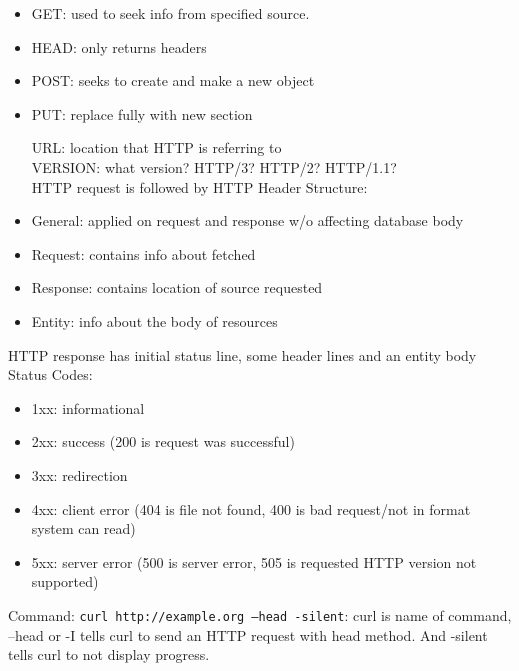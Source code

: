 \documentclass[11pt]{article}
\begin{document}
\begin{itemize}
\item
  GET: used to seek info from specified source.\\
\item
  HEAD: only returns headers\\
\item
  POST: seeks to create and make a new object\\
\item
  PUT: replace fully with new section

  URL: location that HTTP is referring to\\
  VERSION: what version? HTTP/3? HTTP/2? HTTP/1.1?\\
  HTTP request is followed by HTTP Header Structure:
\item
  General: applied on request and response w/o affecting database body\\
\item
  Request: contains info about fetched\\
\item
  Response: contains location of source requested\\
\item
  Entity: info about the body of resources
\end{itemize}

HTTP response has initial status line, some header lines and an entity
body\\
Status Codes:

\begin{itemize}
\item
  1xx: informational\\
\item
  2xx: success (200 is request was successful)\\
\item
  3xx: redirection\\
\item
  4xx: client error (404 is file not found, 400 is bad request/not in
  format system can read)\\
\item
  5xx: server error (500 is server error, 505 is requested HTTP version
  not supported)
\end{itemize}

Command: \texttt{curl\ http://example.org\ –head\ -silent}: curl is name
of command, --head or -I tells curl to send an HTTP request with head
method. And -silent tells curl to not display progress.
\end{document}
